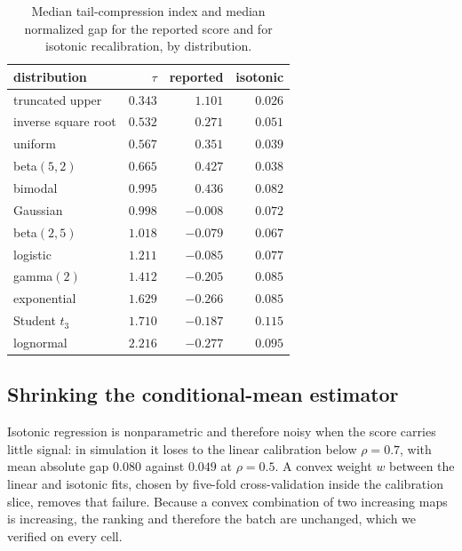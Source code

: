 \documentclass{article}
\theoremstyle{plain}
\theoremstyle{definition}
\begin{document}
\begin{table}[h]
\caption{Median tail-compression index and median normalized gap for the reported
score and for isotonic recalibration, by distribution.}
\label{tab:shapes}
\vskip 0.1in
\begin{center}
\begin{small}
\begin{tabular}{lrrr}
\toprule
distribution & $\tau$ & reported & isotonic \\
\midrule
truncated upper & $0.343$ & $1.101$ & $0.026$ \\
inverse square root & $0.532$ & $0.271$ & $0.051$ \\
uniform & $0.567$ & $0.351$ & $0.039$ \\
beta$(5,2)$ & $0.665$ & $0.427$ & $0.038$ \\
bimodal & $0.995$ & $0.436$ & $0.082$ \\
Gaussian & $0.998$ & $-0.008$ & $0.072$ \\
beta$(2,5)$ & $1.018$ & $-0.079$ & $0.067$ \\
logistic & $1.211$ & $-0.085$ & $0.077$ \\
gamma$(2)$ & $1.412$ & $-0.205$ & $0.085$ \\
exponential & $1.629$ & $-0.266$ & $0.085$ \\
Student $t_3$ & $1.710$ & $-0.187$ & $0.115$ \\
lognormal & $2.216$ & $-0.277$ & $0.095$ \\
\bottomrule
\end{tabular}
\end{small}
\end{center}
\vskip -0.1in
\end{table}

\subsection{Shrinking the conditional-mean estimator}
\label{app:shrink}

Isotonic regression is nonparametric and therefore noisy when the score carries little
signal: in simulation it loses to the linear calibration below $\rho = 0.7$, with mean
absolute gap $0.080$ against $0.049$ at $\rho = 0.5$. A convex weight $w$ between the
linear and isotonic fits, chosen by five-fold cross-validation inside the calibration
slice, removes that failure. Because a convex combination of two increasing maps is
increasing, the ranking and therefore the batch are unchanged, which we verified on
every cell.
\end{document}
